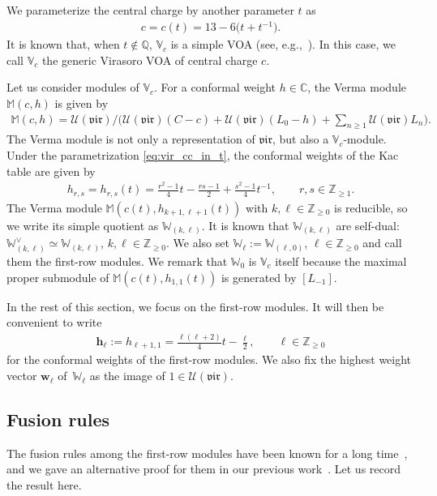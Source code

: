 \documentclass[pdftex]{sigma}
\numberwithin{equation}{section}
\newcommand{\bC}{\mathbb{C}}
\newcommand{\bQ}{\mathbb{Q}}
\newcommand{\bZ}{\mathbb{Z}}
\newcommand{\cU}{\mathcal{U}}
\newcommand{\UEA}{\cU}
\newcommand{\virvoa}{\mathbb{V}}
\newcommand{\virVerma}{\mathbb{M}}
\newcommand{\virmod}{\mathbb{W}}
\newcommand{\vir}{\mathfrak{vir}}
\newcommand{\hwvec}{\mathbf{w}}
\newcommand{\frweight}[1]{\mathbf{h}_{#1}}
\begin{document}
We parameterize the central charge by another parameter $t$ as
\begin{gather}
\label{eq:vir_cc_in_t}
 c=c(t)=13-6\big(t+t^{-1}\big).
\end{gather}
It is known that, when $t\not\in\bQ$, $\virvoa_{c}$ is a simple VOA (see, e.g.,~\cite{IK-representation_theory_of_the_Virasoro_algebra}).
In this case, we call $\virvoa_{c}$ the generic Virasoro VOA of central charge $c$.

Let us consider modules of $\virvoa_{c}$.
For a conformal weight $h\in\bC$, the Verma module $\virVerma (c,h)$ is given by
\begin{gather*}
 \virVerma (c,h)= \UEA (\vir)/\big(\UEA (\vir)(C-c)+\UEA(\vir)(L_{0}-h)+\textstyle{\sum_{n\geq 1}}\UEA(\vir)L_{n}\big).
\end{gather*}
The Verma module is not only a representation of $\vir$, but also a $\virvoa_{c}$-module.
Under the parametrization \eqref{eq:vir_cc_in_t}, the conformal weights of the Kac table are given by
\begin{gather*}
	h_{r,s} = h_{r,s}(t)= \frac{r^{2}-1}{4}t-\frac{rs-1}{2}+\frac{s^{2}-1}{4}t^{-1},\qquad r,s\in \bZ_{\geq 1}.
\end{gather*}
The Verma module $\virVerma (c(t),h_{k+1,\ell +1}(t))$ with $k,\ell\in\bZ_{\geq 0}$ is reducible, so we write its simple quotient as $\virmod_{(k,\ell)}$.
It is known that $\virmod_{(k,\ell)}$ are self-dual: $\virmod_{(k,\ell)}^{\vee}\simeq \virmod_{(k,\ell)}$, $k,\ell\in\bZ_{\geq 0}$.
We also set $\virmod_{\ell}:= \virmod_{(\ell,0)}$, $\ell\in\bZ_{\geq 0}$ and call them the first-row modules.
We remark that $\virmod_{0}$ is $\virvoa_{c}$ itself because the maximal proper submodule of $\virVerma (c(t),h_{1,1}(t))$ is generated by $[L_{-1}]$.

In the rest of this section, we focus on the first-row modules.
It will then be convenient to write
\begin{gather}
\label{eq:conf_weight_fr}
	\frweight{\ell}:= h_{\ell+1,1} = \frac{\ell(\ell+2)}{4}t-\frac{\ell}{2},\qquad \ell\in\bZ_{\geq 0}
\end{gather}
for the conformal weights of the first-row modules.
We also fix the highest weight vector $\hwvec_{\ell}$ of~$\virmod_{\ell}$ as the image of $1\in\UEA(\vir)$.

\subsection{Fusion rules}
The fusion rules among the first-row modules have been known for a long time~\cite{FrenkelZhu2012}, and we gave an alternative proof for them in our previous work~\cite{KoshidaKytola2022}.
Let us record the result here.
\end{document}
